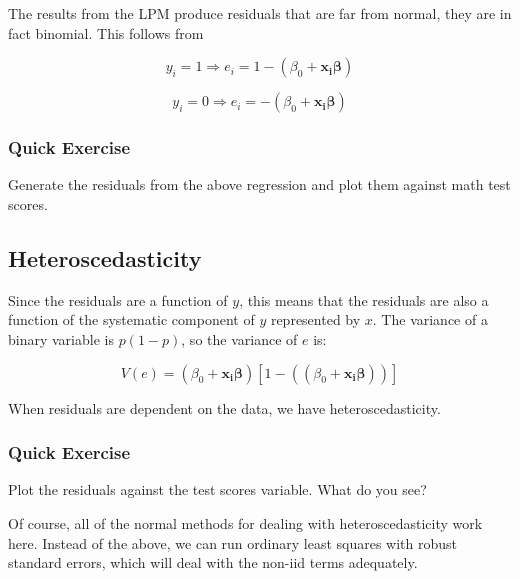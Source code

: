\documentclass[12pt]{article}
\begin{document}
The results from the LPM produce residuals that are far from normal,
they are in fact binomial. This follows from

\begin{equation*}
  y_i=1 \Rightarrow e_i=1-(\beta_0 + \mathbf{x_i\beta})
\end{equation*}


\begin{equation*}
  y_i=0 \Rightarrow e_i=-(\beta_0 + \mathbf{x_i\beta})
\end{equation*}

\subsubsection{Quick Exercise}

Generate the residuals from the above regression and plot them against
math test scores. 

\subsection{Heteroscedasticity}

Since the residuals are a function of $y$, this means that the residuals
are also a function of the systematic component of $y$ represented by
$x$. The variance of a binary variable is $p(1-p)$, so the variance of
$e$ is:

\begin{equation}
  V(e)=(\beta_0 + \mathbf{x_i\beta})[1-((\beta_0 + \mathbf{x_i\beta}))]
\end{equation}

When residuals are dependent on the data, we have heteroscedasticity. 


\subsubsection{Quick Exercise}

Plot the residuals against the test scores variable. What do you see? 

Of course, all of the normal methods for dealing with
heteroscedasticity work here. Instead of the above, we can run
ordinary least squares with robust standard errors, which will deal
with the non-iid terms adequately. 
\end{document}
